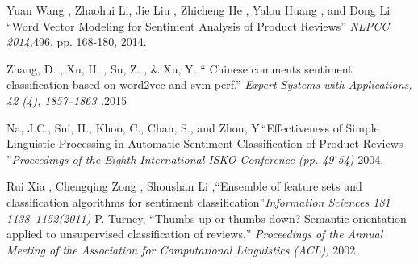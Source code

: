 \documentclass[10pt]{article}
\begin{document}
{\begin{thebibliography}{21}
   Yuan Wang , Zhaohui Li, Jie Liu , Zhicheng He  , Yalou Huang  , and Dong Li 
  ``Word Vector Modeling for Sentiment Analysis
of Product Reviews'' {\em NLPCC 2014,}496, pp. 168-180, 2014.


 Zhang, D. , Xu, H. , Su, Z. , \& Xu, Y.  
  `` Chinese comments sentiment classification based on word2vec and svm perf.''
  {\em Expert Systems with Applications, 42 (4),
1857–1863 .}2015
  
 Na, J.C., Sui, H., Khoo, C., Chan, S., and Zhou, Y.``Effectiveness of Simple Linguistic Processing in Automatic 
Sentiment Classification of Product Reviews ''{\em Proceedings 
of the Eighth International ISKO Conference
 (pp. 49-54)} 2004.
 
 
 Rui Xia , Chengqing Zong  , Shoushan Li ,``Ensemble of feature sets and classification algorithms
for sentiment classification''{\em Information Sciences 181 1138–1152(2011) }
   P. Turney, ``Thumbs up or thumbs down? Semantic orientation applied to unsupervised classification of reviews,'' {\em Proceedings of the 
Annual Meeting of the Association for Computational Linguistics (ACL),} 2002.


    \end{thebibliography}
}
\end{document}
